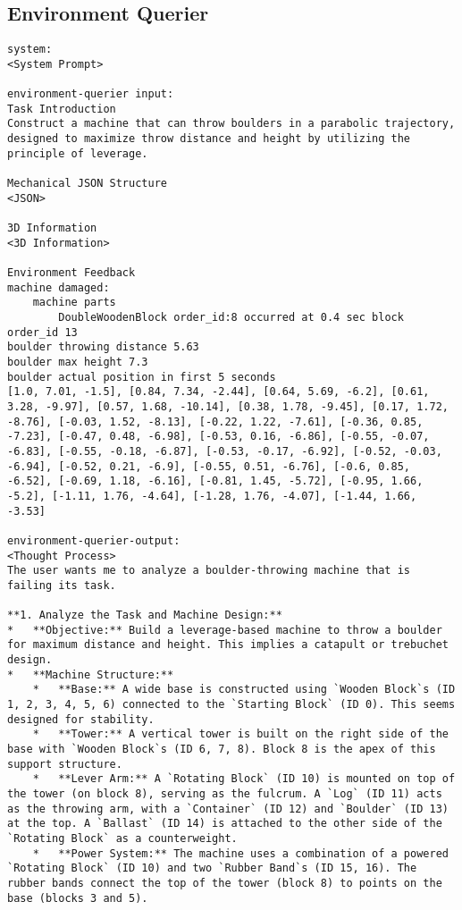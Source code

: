 \subsection{Environment Querier}
\begin{lstlisting}
system:
<System Prompt>

environment-querier input:
Task Introduction
Construct a machine that can throw boulders in a parabolic trajectory, designed to maximize throw distance and height by utilizing the principle of leverage.

Mechanical JSON Structure
<JSON>

3D Information
<3D Information>

Environment Feedback
machine damaged:
    machine parts
        DoubleWoodenBlock order_id:8 occurred at 0.4 sec block order_id 13 
boulder throwing distance 5.63
boulder max height 7.3
boulder actual position in first 5 seconds
[1.0, 7.01, -1.5], [0.84, 7.34, -2.44], [0.64, 5.69, -6.2], [0.61, 3.28, -9.97], [0.57, 1.68, -10.14], [0.38, 1.78, -9.45], [0.17, 1.72, -8.76], [-0.03, 1.52, -8.13], [-0.22, 1.22, -7.61], [-0.36, 0.85, -7.23], [-0.47, 0.48, -6.98], [-0.53, 0.16, -6.86], [-0.55, -0.07, -6.83], [-0.55, -0.18, -6.87], [-0.53, -0.17, -6.92], [-0.52, -0.03, -6.94], [-0.52, 0.21, -6.9], [-0.55, 0.51, -6.76], [-0.6, 0.85, -6.52], [-0.69, 1.18, -6.16], [-0.81, 1.45, -5.72], [-0.95, 1.66, -5.2], [-1.11, 1.76, -4.64], [-1.28, 1.76, -4.07], [-1.44, 1.66, -3.53]

environment-querier-output:
<Thought Process>
The user wants me to analyze a boulder-throwing machine that is failing its task.

**1. Analyze the Task and Machine Design:**
*   **Objective:** Build a leverage-based machine to throw a boulder for maximum distance and height. This implies a catapult or trebuchet design.
*   **Machine Structure:**
    *   **Base:** A wide base is constructed using `Wooden Block`s (ID 1, 2, 3, 4, 5, 6) connected to the `Starting Block` (ID 0). This seems designed for stability.
    *   **Tower:** A vertical tower is built on the right side of the base with `Wooden Block`s (ID 6, 7, 8). Block 8 is the apex of this support structure.
    *   **Lever Arm:** A `Rotating Block` (ID 10) is mounted on top of the tower (on block 8), serving as the fulcrum. A `Log` (ID 11) acts as the throwing arm, with a `Container` (ID 12) and `Boulder` (ID 13) at the top. A `Ballast` (ID 14) is attached to the other side of the `Rotating Block` as a counterweight.
    *   **Power System:** The machine uses a combination of a powered `Rotating Block` (ID 10) and two `Rubber Band`s (ID 15, 16). The rubber bands connect the top of the tower (block 8) to points on the base (blocks 3 and 5).


\end{lstlisting}

